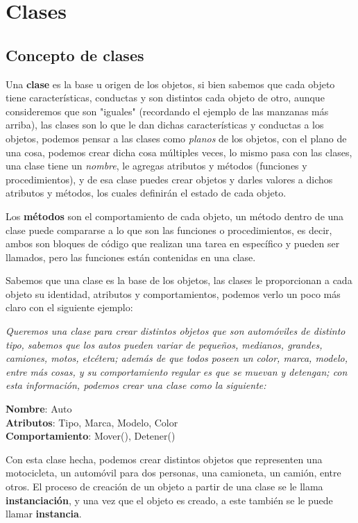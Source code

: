 \section{Clases}


\subsection{Concepto de clases}
\hspace{0.55cm}Una \textbf{clase} es la base u origen de los objetos, si bien sabemos que cada objeto tiene características, conductas y son distintos cada objeto de otro, aunque consideremos que son "iguales" (recordando el ejemplo de las manzanas más arriba), las clases son lo que le dan dichas características y conductas a los objetos, podemos pensar a las clases como \textit{planos} de los objetos, con el plano de una cosa, podemos crear dicha cosa múltiples veces, lo mismo pasa con las clases, una clase tiene un \textit{nombre}, le agregas atributos y métodos (funciones y procedimientos), y de esa clase puedes crear objetos y darles valores a dichos atributos y métodos, los cuales definirán el estado de cada objeto.

Los \textbf{métodos} son el comportamiento de cada objeto, un método dentro de una clase puede compararse a lo que son las funciones o procedimientos, es decir, ambos son bloques de código que realizan una tarea en específico y pueden ser llamados, pero las funciones están contenidas en una clase.

Sabemos que una clase es la base de los objetos, las clases le proporcionan a cada objeto su identidad, atributos y comportamientos, podemos verlo un poco más claro con el siguiente ejemplo:

\textit{Queremos una clase para crear distintos objetos que son automóviles de distinto tipo, sabemos que los autos pueden variar de pequeños, medianos, grandes, camiones, motos, etcétera; además de que todos poseen un color, marca, modelo, entre más cosas, y su comportamiento regular es que se muevan y detengan; con esta información, podemos crear una clase como la siguiente:}
\begin{center}
    \textbf{Nombre}: Auto \\
    \textbf{Atributos}: Tipo, Marca, Modelo, Color \\
    \textbf{Comportamiento}: Mover(), Detener()
\end{center}

Con esta clase hecha, podemos crear distintos objetos que representen una motocicleta, un automóvil para dos personas, una camioneta, un camión, entre otros. El proceso de creación de un objeto a partir de una clase se le llama \textbf{instanciación}, y una vez que el objeto es creado, a este también se le puede llamar \textbf{instancia}.

